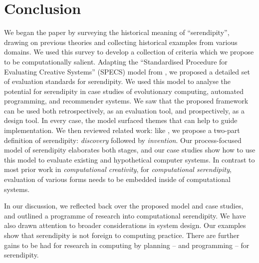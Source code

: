 \section{Conclusion} \label{sec:conclusion}

%
We began the paper by surveying the historical meaning of
``serendipity'', drawing on previous theories and collecting
historical examples from various domains.  We used this survey to
develop a collection of criteria which we propose to be
computationally salient.
%
Adapting the ``Standardised Procedure for Evaluating Creative
Systems'' (SPECS) model from , we proposed a
detailed set of evaluation standards for serendipity.
%
We used this model to analyse the potential for serendipity in case
studies of evolutionary computing, automated
programming, and recommender systems.  We saw that the proposed framework can be used both
retrospectively, as an evaluation tool, and prospectively, as a design
tool.  In every case, the model surfaced themes that can help to guide
implementation.
%
We then reviewed related work: like , we
propose a two-part definition of serendipity: \emph{discovery}
followed by \emph{invention}.  Our process-focused model of
serendipity elaborates both stages, and our case studies show how to
use this model to evaluate existing and hypothetical computer systems.
In contrast to most prior work in \emph{computational creativity}, for
\emph{computational serendipity}, evaluation of various forms needs to
be embedded inside of computational systems.

In our discussion, we reflected back over the proposed model and case
studies, and outlined a programme of research into computational
serendipity.  We have also drawn attention to broader considerations
in system design.  Our examples show that serendipity is not foreign
to computing practice.  There are further gains to be had for research
in computing by planning -- and programming -- for serendipity.


